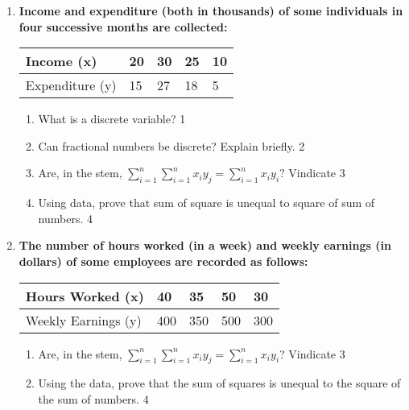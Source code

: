 \documentclass[a4paper,oneside]{book}
\begin{document}
\begin{enumerate}
  \item
  \textbf{Income and expenditure (both in thousands) of some individuals in four successive months are collected:}
 
\begin{table}[h]
 \begin{center}
\begin{tabular}{l|l|l|l|l}

Income (x)  & 20 & 30 & 25 & 10 \\ \hline
Expenditure (y) & 15  & 27  & 18 & 5 \\ 
\end{tabular}
\end{center}
\end{table}


  \begin{enumerate}
    \item
	What is a discrete variable? \hfill 1
    \item
    	Can fractional numbers be discrete? Explain briefly.  \hfill 2
    \item
    	Are, in the stem, $\displaystyle \sum_{i=1}^{n} 
    	\sum_{i=1}^{n} x_iy_j = \sum_{i=1}^{n} x_iy_i?$ Vindicate \hfill 3
     \item
     	Using data, prove  that sum of square is unequal 
     	to square of sum of numbers. \hfill 4
  \end{enumerate}
  
  \item
\textbf{The number of hours worked (in a week) and weekly earnings (in dollars) of some employees are recorded as follows:}

\begin{table}[h]
\begin{center}
\begin{tabular}{l|l|l|l|l}
Hours Worked (x)  & 40 & 35 & 50 & 30 \\ \hline
Weekly Earnings (y) & 400  & 350  & 500 & 300 \\ 
\end{tabular}
\end{center}
\end{table}

\begin{enumerate}
    \item
    Are, in the stem, $\displaystyle \sum_{i=1}^{n} \sum_{i=1}^{n} x_iy_j = \sum_{i=1}^{n} x_iy_i$? Vindicate \hfill 3
    \item
    Using the data, prove that the sum of squares is unequal to the square of the sum of numbers. \hfill 4
\end{enumerate}


\end{enumerate}
\end{document}
